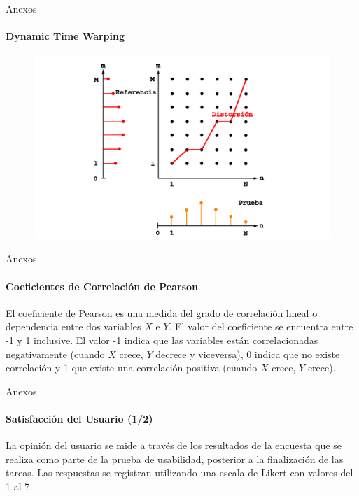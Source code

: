 \begin{frame}[noframenumbering]{Anexos}
\framesubtitle{Dynamic Time Warping}
\begin{figure}[H]
\centering
\includegraphics[width=1\linewidth]{./graphics/dtw-anexos.png}
\end{figure}
\end{frame}

\begin{frame}[noframenumbering]{Anexos}
\framesubtitle{Coeficientes de Correlaci\'on de Pearson}
El coeficiente de Pearson es una medida del grado de correlaci\'on lineal o dependencia entre dos 
variables $X$ e $Y$. El valor del coeficiente se encuentra entre -1 y 1 inclusive. 
El valor -1 indica que las variables est\'an correlacionadas negativamente 
(cuando $X$ crece, $Y$ decrece y viceversa), 0 indica que no existe correlaci\'on y 1 que existe una 
correlaci\'on positiva (cuando $X$ crece, $Y$ crece).
\end{frame}

\begin{frame}[noframenumbering]{Anexos}
\framesubtitle{Satisfacci\'on del Usuario (1/2)}
La opini\'on del usuario se mide a trav\'es de los resultados de la encuesta que se realiza como parte de
la prueba de usabilidad, posterior a la finalizaci\'on de las tareas. Las respuestas se
registran utilizando una escala de Likert con valores del 1 al 7.
\end{frame}

